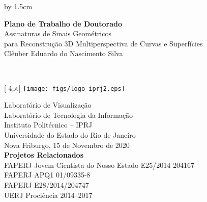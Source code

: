 \begin{titlepage}
\begin{changemargin}{-0.5cm}{-1cm}
\renewcommand{\title}{%
  {\LARGE Assinaturas de Sinais Geométricos}\\[4pt]
  {\LARGE para Reconstrução 3D Multiperspectiva de Curvas e Superfícies}
}
\renewcommand{\author}{Clêuber Eduardo do Nascimento Silva}
\newcommand{\info}{%
  \raisebox{4pt}[-4pt]{%
  \texttt{[image: figs/logo-iprj2.eps]} 
  \hspace{0.1in}
  }

  Laboratório de Visualização\\
  Laboratório de Tecnologia da Informação\\
  Instituto Politécnico -- IPRJ\\
  Universidade do Estado do Rio de Janeiro\\[1.5cm]

  Nova Friburgo, 15 de Novembro de 2020\\[1.5cm]

  \textbf{Projetos Relacionados}\\[4pt]
   FAPERJ Jovem Cientista do Nosso Estado E25/2014 204167\\
   FAPERJ APQ1 01/09335-8\\
   FAPERJ E28/2014/204747\\
   UERJ Prociência 2014--2017
}

\newlength{\topToTitle} 
\setlength{\topToTitle}{30pt}

\newlength{\leftToTitle} 
\setlength{\leftToTitle}{-50pt}

\newlength{\titleToInfo} 
\setlength{\titleToInfo}{7cm}

\newlength{\myTextWidth}
\setlength{\myTextWidth}{\textwidth}
\advance\myTextWidth by 1.5cm


\thispagestyle{empty}
\vspace*{\topToTitle}
\begin{minipage}{\myTextWidth}
  \sffamily
  \hspace*{\leftToTitle}\begin{minipage}{60cm}
    \Large\textbf{Plano de Trabalho de Doutorado}\\[1.5cm]
    \title\\[1.5cm]
    \author
  \end{minipage}\\

  \vspace*{\titleToInfo}

  \begin{minipage}{\textwidth}
    \flushright
    \info
  \end{minipage}
\end{minipage}%
\end{changemargin}
\end{titlepage}

